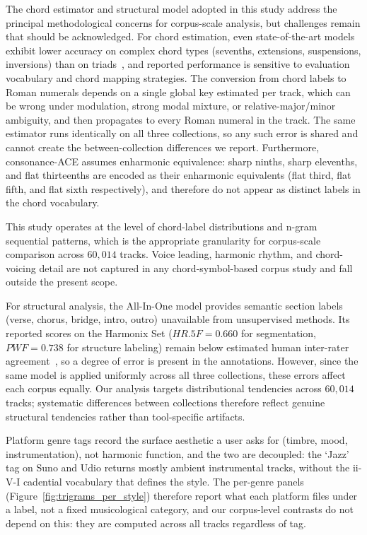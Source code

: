 \documentclass{article}
\newcommand{\rev}[1]{{\color{r2}#1}} %
\begin{document}
The chord estimator and structural model adopted in this study 
address the principal methodological concerns for corpus-scale analysis, but challenges remain that should be acknowledged. For chord estimation, even state-of-the-art models exhibit lower accuracy on complex chord types (sevenths, extensions, suspensions, inversions) than on triads~\citep{pauwels2013evaluating}, and reported performance is sensitive to evaluation vocabulary and chord mapping strategies. \rev{The conversion from chord labels to Roman numerals depends on a single global key estimated per track, which can be wrong under modulation, strong modal mixture, or relative-major/minor ambiguity, and then propagates to every Roman numeral in the track. The same estimator runs identically on all three collections, so any such error is shared and cannot create the between-collection differences we report.} Furthermore, consonance-ACE assumes enharmonic equivalence: sharp ninths, sharp elevenths, and flat thirteenths are encoded as their enharmonic equivalents (flat third, flat fifth, and flat sixth respectively), and therefore do not appear as distinct labels in the chord vocabulary.

This study operates at the level of chord-label distributions and n-gram sequential patterns, which is the appropriate granularity for corpus-scale comparison across $60,014$ tracks. Voice leading, harmonic rhythm, and chord-voicing detail are not captured in any chord-symbol-based corpus study and fall outside the present scope.

For structural analysis, the All-In-One model provides semantic section labels (verse, chorus, bridge, intro, outro) unavailable from unsupervised methods. Its reported scores on the Harmonix Set ($HR.5F = 0.660$ for segmentation, $PWF = 0.738$ for structure labeling) remain below estimated human inter-rater agreement~\citep{nieto2020audio}, so a degree of error is present in the annotations. However, since the same model is applied uniformly across all three collections, these errors affect each corpus equally. Our analysis targets distributional tendencies across $60,014$ tracks; systematic differences between collections therefore reflect genuine structural tendencies rather than tool-specific artifacts.

\rev{Platform genre tags record the surface aesthetic a user asks for (timbre, mood, instrumentation), not harmonic function, and the two are decoupled: the `Jazz' tag on Suno and Udio returns mostly ambient instrumental tracks, without the ii-V-I cadential vocabulary that defines the style. The per-genre panels (Figure~\ref{fig:trigrams_per_style}) therefore report what each platform files under a label, not a fixed musicological category, and our corpus-level contrasts do not depend on this: they are computed across all tracks regardless of tag.}
\end{document}
